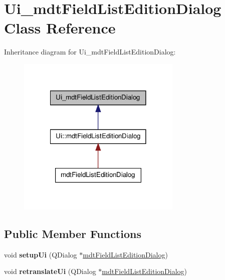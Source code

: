 \hypertarget{class_ui__mdt_field_list_edition_dialog}{
\section{Ui\_\-mdtFieldListEditionDialog Class Reference}
\label{class_ui__mdt_field_list_edition_dialog}
}


Inheritance diagram for Ui\_\-mdtFieldListEditionDialog:\nopagebreak
\begin{figure}[H]
\begin{center}
\leavevmode
\includegraphics[width=222pt]{class_ui__mdt_field_list_edition_dialog__inherit__graph}
\end{center}
\end{figure}
\subsection*{Public Member Functions}
\begin{DoxyCompactItemize}
\item 
\hypertarget{class_ui__mdt_field_list_edition_dialog_a4662dc90befa58da4568df605a7d26c9}{
void {\bfseries setupUi} (QDialog $\ast$\hyperlink{classmdt_field_list_edition_dialog}{mdtFieldListEditionDialog})}
\label{class_ui__mdt_field_list_edition_dialog_a4662dc90befa58da4568df605a7d26c9}

\item 
\hypertarget{class_ui__mdt_field_list_edition_dialog_ac60ef5646ffc3019728f695a0b7cb2fd}{
void {\bfseries retranslateUi} (QDialog $\ast$\hyperlink{classmdt_field_list_edition_dialog}{mdtFieldListEditionDialog})}
\label{class_ui__mdt_field_list_edition_dialog_ac60ef5646ffc3019728f695a0b7cb2fd}

\end{DoxyCompactItemize}
